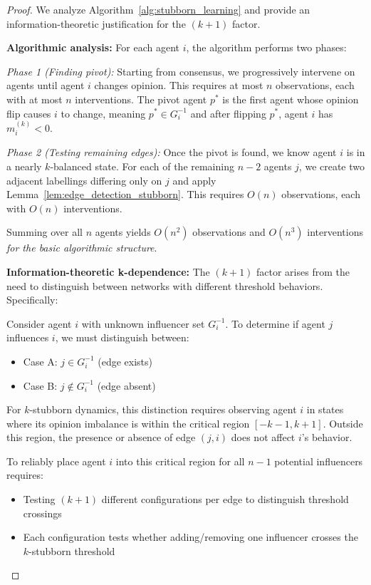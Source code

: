 \documentclass[conference]{IEEEtran}
\begin{document}
\begin{proof}
We analyze Algorithm~\ref{alg:stubborn_learning} and provide an information-theoretic justification for the $(k+1)$ factor.

\textbf{Algorithmic analysis:} For each agent $i$, the algorithm performs two phases:

\emph{Phase 1 (Finding pivot):} Starting from consensus, we progressively intervene on agents until agent $i$ changes opinion. This requires at most $n$ observations, each with at most $n$ interventions. The pivot agent $p^*$ is the first agent whose opinion flip causes $i$ to change, meaning $p^* \in G_i^{-1}$ and after flipping $p^*$, agent $i$ has $m_i^{(k)} < 0$.

\emph{Phase 2 (Testing remaining edges):} Once the pivot is found, we know agent $i$ is in a nearly $k$-balanced state. For each of the remaining $n-2$ agents $j$, we create two adjacent labellings differing only on $j$ and apply Lemma~\ref{lem:edge_detection_stubborn}. This requires $O(n)$ observations, each with $O(n)$ interventions.

Summing over all $n$ agents yields $O(n^2)$ observations and $O(n^3)$ interventions \emph{for the basic algorithmic structure}.

\textbf{Information-theoretic k-dependence:} The $(k+1)$ factor arises from the need to distinguish between networks with different threshold behaviors. Specifically:

Consider agent $i$ with unknown influencer set $G_i^{-1}$. To determine if agent $j$ influences $i$, we must distinguish between:
\begin{itemize}
\item Case A: $j \in G_i^{-1}$ (edge exists)
\item Case B: $j \notin G_i^{-1}$ (edge absent)
\end{itemize}

For $k$-stubborn dynamics, this distinction requires observing agent $i$ in states where its opinion imbalance is within the critical region $[-k-1, k+1]$. Outside this region, the presence or absence of edge $(j,i)$ does not affect $i$'s behavior.

To reliably place agent $i$ into this critical region for all $n-1$ potential influencers requires:
\begin{itemize}
\item Testing $(k+1)$ different configurations per edge to distinguish threshold crossings
\item Each configuration tests whether adding/removing one influencer crosses the $k$-stubborn threshold
\end{itemize}


\end{proof}
\end{document}
